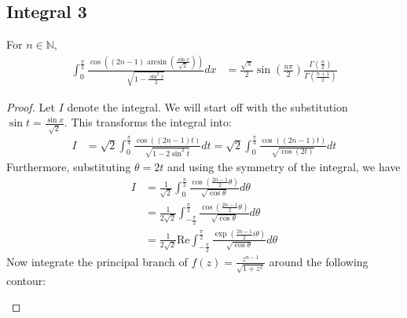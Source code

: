 \subsection{Integral 3}
For $n\in \mathbb{N}$,
\begin{align*}
\int_0^{\frac{\pi}{2}}\frac{\cos\left((2n-1)\arcsin\left(\frac{\sin x}{\sqrt{2}}\right) \right)}{\sqrt{1-\frac{\sin^2 x}{2}}}dx &= \frac{\sqrt{\pi}}{2}\sin\left(\frac{n\pi}{2}\right)\frac{\Gamma\left(\frac{n}{2} \right)}{\Gamma\left(\frac{n+1}{2}\right)}
\end{align*}

\begin{proof}
Let $I$ denote the integral. We will start off with the substitution $\sin t = \frac{\sin x}{\sqrt{2}}$. This transforms the integral into:
\begin{align*}
I &= \sqrt{2}\int_0^{\frac{\pi}{4}}\frac{\cos\left((2n-1) t\right)}{\sqrt{1-2\sin^2 t}}dt = \sqrt{2}\int_0^{\frac{\pi}{4}}\frac{\cos\left((2n-1) t\right)}{\sqrt{\cos(2t)}}dt
\end{align*}
Furthermore, substituting $\theta = 2t$ and using the symmetry of the integral, we have
\begin{align*}
I &= \frac{1}{\sqrt{2}} \int_{0}^{\frac{\pi}{2}}\frac{\cos\left(\frac{2n-1}{2}\theta\right)}{\sqrt{\cos \theta}}d\theta \\ &= \frac{1}{2\sqrt{2}} \int_{-\frac{\pi}{2}}^{\frac{\pi}{2}}\frac{\cos\left(\frac{2n-1}{2}\theta\right)}{\sqrt{\cos \theta}}d\theta \\
&= \frac{1}{2\sqrt{2}} \text{Re}\int_{-\frac{\pi}{2}}^{\frac{\pi}{2}}\frac{\exp\left(\frac{2n-1}{2}i\theta\right)}{\sqrt{\cos \theta}}d\theta \tag{1}
\end{align*}
Now integrate the principal branch of $f(z) = \frac{z^{n-1}}{\sqrt{1+z^2}}$ around the following contour:
\begin{figure}[h]
\centering
{}
\end{figure}


\end{proof}
